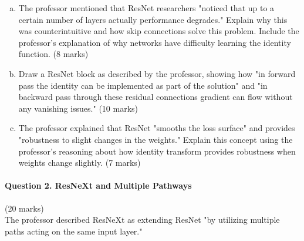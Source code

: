 \documentclass[12pt]{article}
\newcommand{\shortanswer}{\vspace{2cm}}
\newcommand{\mediumanswer}{\vspace{3cm}}
\begin{document}
\begin{enumerate}[(a)]
    \item The professor mentioned that ResNet researchers "noticed that up to a certain number of layers actually performance degrades." Explain why this was counterintuitive and how skip connections solve this problem. Include the professor's explanation of why networks have difficulty learning the identity function. \hfill (8 marks)
    
    \mediumanswer
    
    \item Draw a ResNet block as described by the professor, showing how "in forward pass the identity can be implemented as part of the solution" and "in backward pass through these residual connections gradient can flow without any vanishing issues." \hfill (10 marks)
    
    \begin{center}
    \end{center}
    
    \shortanswer
    
    \item The professor explained that ResNet "smooths the loss surface" and provides "robustness to slight changes in the weights." Explain this concept using the professor's reasoning about how identity transform provides robustness when weights change slightly. \hfill (7 marks)
    
    \mediumanswer
\end{enumerate}

\newpage
\paragraph{Question 2. ResNeXt and Multiple Pathways}{\hfill (20 marks)}\\
The professor described ResNeXt as extending ResNet "by utilizing multiple paths acting on the same input layer."
\end{document}

